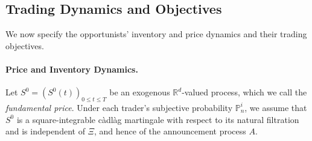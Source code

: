 \documentclass[12pt]{article}
\numberwithin{equation}{section}
\theoremstyle{definition}
\begin{document}
\subsection{Trading Dynamics and Objectives}\label{sec:opportunists}

We now specify the opportunists' inventory and price dynamics and their
trading objectives.

\paragraph{Price and Inventory Dynamics.} Let \(S^0=(S^0(t))_{0\le t\le T}\) be an exogenous
\(\mathbb R^d\)-valued process, which we call the \emph{fundamental price}.
Under each trader's subjective probability \(\mathbb P_n^i\), we assume that
\(S^0\) is a square-integrable càdlàg martingale with respect to its natural
filtration and is independent of \(\Xi\), and hence of the announcement process
\(A\).
\end{document}
